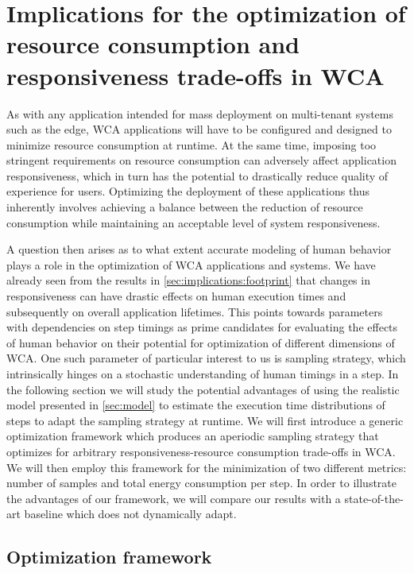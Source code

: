 \section{Implications for the optimization of resource consumption and responsiveness trade-offs in \gls{WCA}}\label{sec:implications:optimization}

As with any application intended for mass deployment on multi-tenant systems such as the edge, \gls{WCA} applications will have to be configured and designed to minimize resource consumption at runtime.
At the same time, imposing too stringent requirements on resource consumption can adversely affect application responsiveness, which in turn has the potential to drastically reduce quality of experience for users.
Optimizing the deployment of these applications thus inherently involves achieving a balance between the reduction of resource consumption while maintaining an acceptable level of system responsiveness.

A question then arises as to what extent accurate modeling of human behavior plays a role in the optimization of \gls{WCA} applications and systems.
We have already seen from the results in \cref{sec:implications:footprint} that changes in responsiveness can have drastic effects on human execution times and subsequently on overall application lifetimes.
This points towards parameters with dependencies on step timings as prime candidates for evaluating the effects of human behavior on their potential for optimization of different dimensions of \gls{WCA}.
One such parameter of particular interest to us is sampling strategy, which intrinsically hinges on a stochastic understanding of human timings in a step.
In the following section we will study the potential advantages of using the realistic model presented in \cref{sec:model} to estimate the execution time distributions of steps to adapt the sampling strategy at runtime.
We will first introduce a generic optimization framework which produces an aperiodic sampling strategy that optimizes for arbitrary responsiveness-resource consumption trade-offs in \gls{WCA}.
We will then employ this framework for the minimization of two different metrics: number of samples and total energy consumption per step.
In order to illustrate the advantages of our framework, we will compare our results with a state-of-the-art baseline which does not dynamically adapt.

\subsection{Optimization framework}\label{ssec:optframework}

